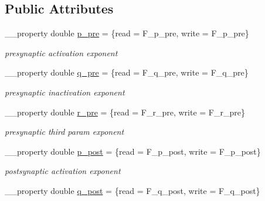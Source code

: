 \subsection*{Public Attributes}
\begin{DoxyCompactItemize}
\item 
\hypertarget{class_t_h_h2_current_a5b74829c0c839cfe13251b3397aa546b}{\+\_\+\+\_\+property double \hyperlink{class_t_h_h2_current_a5b74829c0c839cfe13251b3397aa546b}{p\+\_\+pre} = \{read = F\+\_\+p\+\_\+pre, write = F\+\_\+p\+\_\+pre\}}\label{class_t_h_h2_current_a5b74829c0c839cfe13251b3397aa546b}

\begin{DoxyCompactList}\small\item\em presynaptic activation exponent \end{DoxyCompactList}\item 
\hypertarget{class_t_h_h2_current_a83091d6bba1d4561b0c78d114e3171d5}{\+\_\+\+\_\+property double \hyperlink{class_t_h_h2_current_a83091d6bba1d4561b0c78d114e3171d5}{q\+\_\+pre} = \{read = F\+\_\+q\+\_\+pre, write = F\+\_\+q\+\_\+pre\}}\label{class_t_h_h2_current_a83091d6bba1d4561b0c78d114e3171d5}

\begin{DoxyCompactList}\small\item\em presynaptic inactivation exponent \end{DoxyCompactList}\item 
\hypertarget{class_t_h_h2_current_a6f4db490c5aaa51249cf62c8d385ce61}{\+\_\+\+\_\+property double \hyperlink{class_t_h_h2_current_a6f4db490c5aaa51249cf62c8d385ce61}{r\+\_\+pre} = \{read = F\+\_\+r\+\_\+pre, write = F\+\_\+r\+\_\+pre\}}\label{class_t_h_h2_current_a6f4db490c5aaa51249cf62c8d385ce61}

\begin{DoxyCompactList}\small\item\em presynaptic third param exponent \end{DoxyCompactList}\item 
\hypertarget{class_t_h_h2_current_a26d9308d16a5a093bc03f8c7c038e5fd}{\+\_\+\+\_\+property double \hyperlink{class_t_h_h2_current_a26d9308d16a5a093bc03f8c7c038e5fd}{p\+\_\+post} = \{read = F\+\_\+p\+\_\+post, write = F\+\_\+p\+\_\+post\}}\label{class_t_h_h2_current_a26d9308d16a5a093bc03f8c7c038e5fd}

\begin{DoxyCompactList}\small\item\em postsynaptic activation exponent \end{DoxyCompactList}\item 
\hypertarget{class_t_h_h2_current_af833a70bee269fb98afe6c5106536082}{\+\_\+\+\_\+property double \hyperlink{class_t_h_h2_current_af833a70bee269fb98afe6c5106536082}{q\+\_\+post} = \{read = F\+\_\+q\+\_\+post, write = F\+\_\+q\+\_\+post\}}\label{class_t_h_h2_current_af833a70bee269fb98afe6c5106536082}


\end{DoxyCompactItemize}
